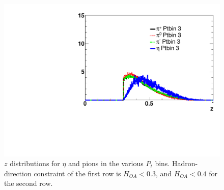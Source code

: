 \begin{figure}[H]
\includegraphics[width=.24\textwidth,natwidth=250,natheight=100]{figure_fiducial/had0.4_z0.3/Z_distri_for_ptbin_3_norm_had04.pdf}\hfill
    \caption[$z$ distributions for $\eta$ and pions in the various $P_t$ bins]{$z$ distributions for $\eta$ and pions in the various $P_t$ bins. Hadron-direction constraint of the first row is $H_{OA}<0.3$, and  $H_{OA}<0.4$ for the second row.}
\end{figure}